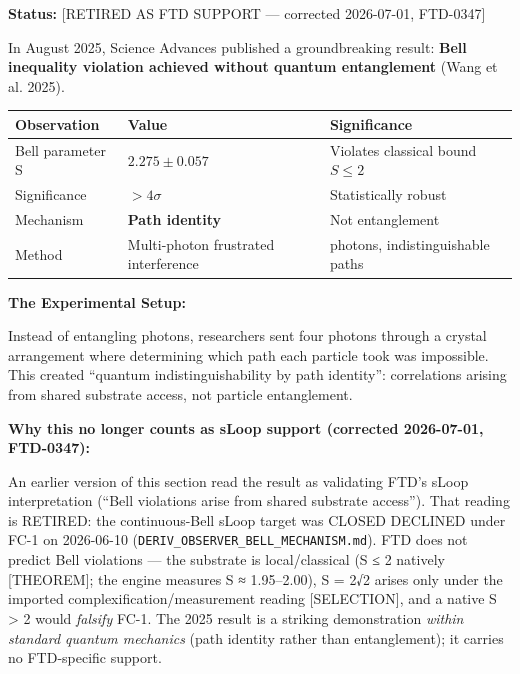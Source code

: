 \documentclass[
  11pt,
  letterpaper,
  twoside,
  openright]{book}
\begin{document}
\textbf{Status:} {[}RETIRED AS FTD SUPPORT --- corrected 2026-07-01,
FTD-0347{]}

In August 2025, Science Advances published a groundbreaking result:
\textbf{Bell inequality violation achieved without quantum entanglement}
(Wang et al. 2025).

\begin{longtable}[]{@{}
  >{\raggedright\arraybackslash}p{}
  >{\raggedright\arraybackslash}p{}
  >{\raggedright\arraybackslash}p{}@{}}
\toprule\noalign{}
\begin{minipage}[b]{\linewidth}\raggedright
Observation
\end{minipage} & \begin{minipage}[b]{\linewidth}\raggedright
Value
\end{minipage} & \begin{minipage}[b]{\linewidth}\raggedright
Significance
\end{minipage} \\
\midrule\noalign{}
\endhead
\bottomrule\noalign{}
\endlastfoot
Bell parameter S & \(2.275 \pm 0.057\) & Violates classical bound
\(S \leq 2\) \\
Significance & \textbf{\(> 4\sigma\)} & Statistically robust \\
Mechanism & \textbf{Path identity} & Not entanglement \\
Method & Multi-photon frustrated interference & 4 photons,
indistinguishable paths \\
\end{longtable}

\textbf{The Experimental Setup:}

Instead of entangling photons, researchers sent four photons through a
crystal arrangement where determining which path each particle took was
impossible. This created ``quantum indistinguishability by path
identity'': correlations arising from shared substrate access, not
particle entanglement.

\textbf{Why this no longer counts as sLoop support (corrected
2026-07-01, FTD-0347):}

An earlier version of this section read the result as validating FTD's
sLoop interpretation (``Bell violations arise from shared substrate
access''). That reading is RETIRED: the continuous-Bell sLoop target was
CLOSED DECLINED under FC-1 on 2026-06-10
(\texttt{DERIV\_OBSERVER\_BELL\_MECHANISM.md}). FTD does not predict
Bell violations --- the substrate is local/classical (S ≤ 2 natively
{[}THEOREM{]}; the engine measures S ≈ 1.95--2.00), S = 2√2 arises only
under the imported complexification/measurement reading {[}SELECTION{]},
and a native S \textgreater{} 2 would \emph{falsify} FC-1. The 2025
result is a striking demonstration \emph{within standard quantum
mechanics} (path identity rather than entanglement); it carries no
FTD-specific support.
\end{document}
